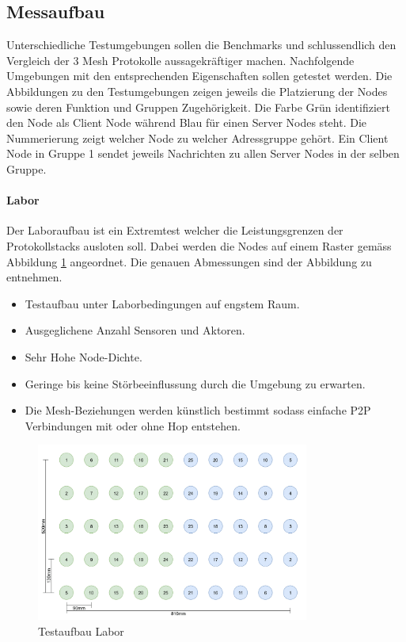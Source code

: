 \newpage
\subsection{Messaufbau}
Unterschiedliche Testumgebungen sollen die Benchmarks und schlussendlich den Vergleich der 3 Mesh Protokolle aussagekräftiger machen. Nachfolgende Umgebungen mit den entsprechenden Eigenschaften sollen getestet werden. Die Abbildungen zu den Testumgebungen zeigen jeweils die Platzierung der Nodes sowie deren Funktion und Gruppen Zugehörigkeit. Die Farbe Grün identifiziert den Node als Client Node während Blau für einen Server Nodes steht. Die Nummerierung zeigt welcher Node zu welcher Adressgruppe gehört. Ein Client Node in Gruppe 1 sendet jeweils Nachrichten zu allen Server Nodes in der selben Gruppe.

\paragraph{Labor}
Der Laboraufbau ist ein Extremtest welcher die Leistungsgrenzen der Protokollstacks ausloten soll. Dabei werden die Nodes auf einem Raster gemäss Abbildung \ref{fig:TestaufbauLabor} angeordnet. Die genauen Abmessungen sind der Abbildung zu entnehmen.

\begin{itemize}
	\item Testaufbau unter Laborbedingungen auf engstem Raum.
	\item Ausgeglichene Anzahl Sensoren und Aktoren.
	\item Sehr Hohe Node-Dichte.
	\item Geringe bis keine Störbeeinflussung durch die Umgebung zu erwarten.
	\item Die Mesh-Beziehungen werden künstlich bestimmt sodass einfache P2P Verbindungen mit oder ohne Hop entstehen.
\end{itemize}

\begin{figure}[h]
	\centering
	\includegraphics[width=0.8\textwidth]{graphics/Testaufbau_Labor.png}
	\caption{Testaufbau Labor}
	\label{fig:TestaufbauLabor}
\end{figure}


